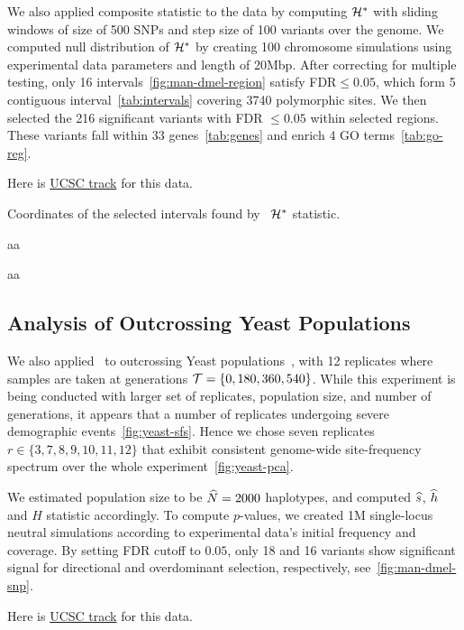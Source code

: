 We also applied composite statistic to the \dmel data by computing ${\cal H}^*$ with 
sliding windows of size of 500 SNPs and step size of 100  variants over the 
genome.
We computed null distribution of ${\cal H}^*$ by creating 100 chromosome simulations 
using experimental data parameters and length of 20Mbp. After correcting for 
multiple testing, only 16 intervals~\ref{fig:man-dmel-region} satisfy 
FDR$\le0.05$, which form 5 contiguous interval~\ref{tab:intervals} covering 
3740 polymorphic sites. We then selected the 216 significant variants with FDR 
$\le0.05$ within selected regions. These variants fall within 33 
genes~\ref{tab:genes} and enrich 4 GO terms~\ref{tab:go-reg}. 


Here is 
\href{https://genome.ucsc.edu/cgi-bin/hgTracks?hgS_doOtherUser=submit&hgS_otherUserName=airanmehr&hgS_otherUserSessionName=Dmel\%20EE\%20HotCold}{UCSC
 track} for this data.

\begin{table}
	
	\caption{Coordinates of the selected intervals found by \comale\ ${\cal H}^*$ 
	statistic.}
	\label{tab:intervals}
\end{table}


\begin{table}

\caption{aa}
	\label{tab:genes}
\end{table}

\begin{table}
	
	\caption{aa}
		\label{tab:go-reg}
\end{table}


\subsection{Analysis of Outcrossing Yeast Populations}
We also applied \comale\ to outcrossing Yeast 
populations~\cite{burke2014standing}, with 12 replicates where samples are 
taken at generations ${\cal T}=\{0,180,360,540\}$. While this experiment is being 
conducted with larger set of replicates, population size, and number of 
generations, it appears that a number of replicates undergoing severe 
demographic events~\ref{fig:yeast-sfs}. Hence we chose seven replicates 
$r\in\{3,7,8,9,10,11,12\}$ that exhibit consistent genome-wide site-frequency 
spectrum over the whole experiment~\ref{fig:yeast-pca}.

We estimated population size to be $\widehat{N}=2000$ haplotypes, and computed $\widehat{s}$, 
$\widehat{h}$ and $H$ statistic accordingly. To compute $p$-values, we created 1M 
single-locus neutral simulations according to experimental data's initial 
frequency and coverage. By setting FDR cutoff to $0.05$, only 18 and 16 
variants 
show significant signal for directional and overdominant selection, 
respectively, see~\ref{fig:man-dmel-snp}.

Here is 
\href{https://genome.ucsc.edu/cgi-bin/hgTracks?hgS_doOtherUser=submit\&hgS_otherUserName=airanmehr\&hgS_otherUserSessionName=Yeast\%20EE}{UCSC
 track} for this data.

